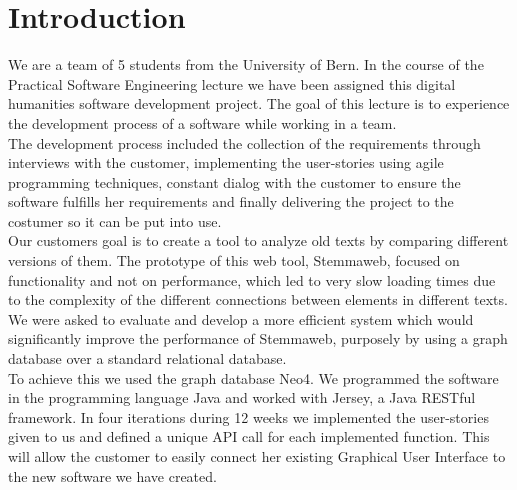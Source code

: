 \documentclass[11pt,fleqn,openany]{book} %
\begin{document}


\chapter{Introduction}

We are a team of 5 students from the University of Bern. In the course of the Practical Software Engineering lecture we have been assigned this digital humanities software development project. The goal of this lecture is to experience the development process of a software while working in a team. \\
The development process included the collection of the requirements through interviews with the customer, implementing the user-stories using agile programming techniques, constant dialog with the customer to ensure the software fulfills her requirements and finally delivering the project to the costumer so it can be put into use. \\
Our customers goal is to create a tool to analyze old texts by comparing different versions of them. The prototype of this web tool, Stemmaweb, focused on functionality and not on performance, which led to very slow loading times due to the complexity of the different connections between elements in different texts. We were asked to evaluate and develop a more efficient system which would significantly improve the performance of Stemmaweb, purposely by using a graph database over a standard relational database. \\
To achieve this we used the graph database Neo4. We programmed the software in the programming language Java and worked with Jersey, a Java RESTful framework. In four iterations during 12 weeks we implemented the user-stories given to us and defined a unique API call for each implemented function. This will allow the customer to easily connect her existing Graphical User Interface to the new software we have created.\\


\end{document}
